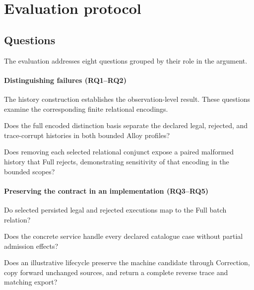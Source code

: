 \section{Evaluation protocol}
\label{sec:evaluation}

\subsection{Questions}

The evaluation addresses eight questions grouped by their role in the argument.

\paragraph{Distinguishing failures (RQ1--RQ2)}
The history construction establishes the observation-level result. These questions examine the corresponding finite relational encodings.
\begin{description}[leftmargin=2.6em,labelwidth=2.1em,style=nextline]
  \item[RQ1] Does the full encoded distinction basis separate the declared legal, rejected, and trace-corrupt histories in both bounded Alloy profiles?
  \item[RQ2] Does removing each selected relational conjunct expose a paired malformed history that Full rejects, demonstrating sensitivity of that encoding in the bounded scopes?
\end{description}

\paragraph{Preserving the contract in an implementation (RQ3--RQ5)}
\begin{description}[leftmargin=2.6em,labelwidth=2.1em,style=nextline]
  \item[RQ3] Do selected persisted legal and rejected executions map to the Full batch relation?
  \item[RQ4] Does the concrete service handle every declared catalogue case without partial admission effects?
  \item[RQ5] Does an illustrative lifecycle preserve the machine candidate through Correction, copy forward unchanged sources, and return a complete reverse trace and matching export?
\end{description}

